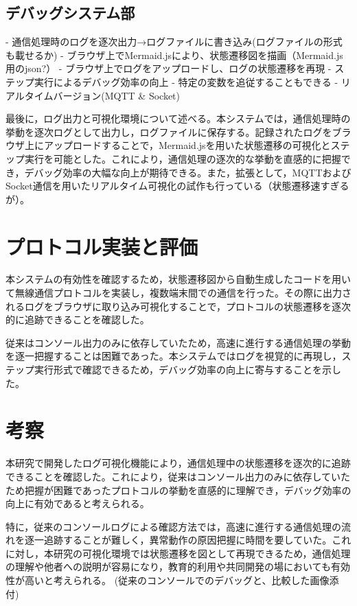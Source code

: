 \documentclass[paper]{ieicej}
\begin{document}
\subsection{デバッグシステム部}
- 通信処理時のログを逐次出力→ログファイルに書き込み(ログファイルの形式も載せるか)
- ブラウザ上でMermaid.jsにより、状態遷移図を描画（Mermaid.js用のjson?）
- ブラウザ上でログをアップロードし、ログの状態遷移を再現
- ステップ実行によるデバッグ効率の向上
- 特定の変数を追従することもできる
- リアルタイムバージョン(MQTT \& Socket)

最後に，ログ出力と可視化環境について述べる。本システムでは，通信処理時の挙動を逐次ログとして出力し，ログファイルに保存する。記録されたログをブラウザ上にアップロードすることで，Mermaid.jsを用いた状態遷移の可視化とステップ実行を可能とした。これにより，通信処理の逐次的な挙動を直感的に把握でき，デバッグ効率の大幅な向上が期待できる。また，拡張として，MQTTおよびSocket通信を用いたリアルタイム可視化の試作も行っている（状態遷移速すぎるが）。

\section{プロトコル実装と評価}
本システムの有効性を確認するため，状態遷移図から自動生成したコードを用いて無線通信プロトコルを実装し，複数端末間での通信を行った。その際に出力されるログをブラウザに取り込み可視化することで，プロトコルの状態遷移を逐次的に追跡できることを確認した。

従来はコンソール出力のみに依存していたため，高速に進行する通信処理の挙動を逐一把握することは困難であった。本システムではログを視覚的に再現し，ステップ実行形式で確認できるため，デバッグ効率の向上に寄与することを示した。

\section{考察}
本研究で開発したログ可視化機能により，通信処理中の状態遷移を逐次的に追跡できることを確認した。これにより，従来はコンソール出力のみに依存していたため把握が困難であったプロトコルの挙動を直感的に理解でき，デバッグ効率の向上に有効であると考えられる。

特に，従来のコンソールログによる確認方法では，高速に進行する通信処理の流れを逐一追跡することが難しく，異常動作の原因把握に時間を要していた。これに対し，本研究の可視化環境では状態遷移を図として再現できるため，通信処理の理解や他者への説明が容易になり，教育的利用や共同開発の場においても有効性が高いと考えられる。
(従来のコンソールでのデバッグと、比較した画像添付)
\end{document}
